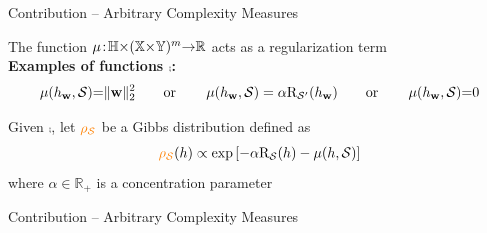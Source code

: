 \documentclass{slides}
\begin{document}
\begin{xframe}{Contribution -- {\small Arbitrary Complexity Measures}}

\vfill

\begin{redbox}{}

\begin{xitemize}

\item The function $\operatorname{\mu}\!:\! \mathbb{H}{\times}(\mathbb{X}{\times}\mathbb{Y})^m {\to} \mathbb{R}$ acts as a regularization term\\[-0.3cm]
    
    {\bf Examples of functions $\comp$:}
    \begin{align*}
         \operatorname{\mu}(h_{\mathbf{w}}, \mathcal{S}) {=} \|\mathbf{w}\|_{2}^2 \quad\quad\text{or}\quad\quad  \operatorname{\mu}(h_{\mathbf{w}}, \mathcal{S}) = \alpha\text{R}_{\mathcal{S}'}(h_{\mathbf{w}}) \quad\quad\text{or}\quad\quad \operatorname{\mu}(h_{\mathbf{w}}, \mathcal{S}) {=} 0
\end{align*}

\vspace{0.5cm}

\item Given $\comp$, let $\textcolor{orange}{\rho}_{\textcolor{orange}{\mathcal{S}}}$ be a Gibbs distribution defined as 
\begin{align*}
   \textcolor{orange}{\rho}_{\textcolor{orange}{\mathcal{S}}}(\textcolor{black}{h}) \propto \exp\left[-\alpha\text{R}_{\mathcal{S}}(h)-\operatorname{\mu}(h, \mathcal{S})\right]
\end{align*}
where $\alpha\in\mathbb{R}_+$ is a concentration parameter

\end{xitemize}
\end{redbox}

\vfill

\end{xframe}


\begin{xframe}{Contribution -- {\small Arbitrary Complexity Measures}}

\vspace{-0.3cm}
\end{xframe}

\end{document}

